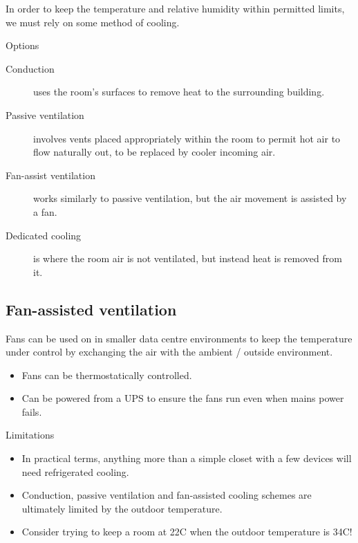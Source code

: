 \documentclass[slides]{pgnotes}
\begin{document}
In order to keep the temperature and relative humidity within permitted limits, we must rely on some method of cooling.

\begin{bluebox}{Options}
\begin{description}
\item[Conduction] uses the room's surfaces to remove heat to the surrounding building.
\item[Passive ventilation] involves vents placed appropriately within the room to permit hot air to flow naturally out, to be replaced by cooler incoming air.
\item[Fan-assist ventilation] works similarly to passive ventilation, but the air movement is assisted by a fan.
\item[Dedicated cooling] is where the room air is not ventilated, but instead heat is removed from it. 
\end{description}
\end{bluebox}



\subsection{Fan-assisted ventilation}

Fans can be used on in smaller data centre environments to keep the temperature under control by exchanging the air with the ambient / outside environment.

\begin{itemize}
\item Fans can be thermostatically controlled.
\item Can be powered from a UPS to ensure the fans run even when mains power fails. 
\end{itemize}

\begin{redbox}{Limitations}
  \begin{itemize}
  \item In practical terms, anything more than a simple closet with a few devices will need refrigerated cooling.
  \item Conduction, passive ventilation and fan-assisted cooling schemes are ultimately limited by the outdoor temperature.
  \item Consider trying to keep a room at 22C when the outdoor temperature is 34C!
  \end{itemize}
\end{redbox}
\end{document}
